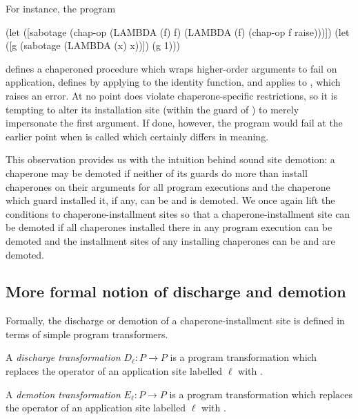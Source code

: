 For instance, the program
\begin{schemedisplay}
(let ([sabotage (chap-op (LAMBDA (f) f) (LAMBDA (f) (chap-op f raise)))])
  (let ([g (sabotage (LAMBDA (x) x))])
    (g 1)))
\end{schemedisplay}
defines a chaperoned procedure  which wraps higher-order arguments to fail on application, defines  by applying  to the identity function, and applies  to , which raises an error.
At no point does  violate chaperone-specific restrictions, so it is tempting to alter its installation site (within the guard of ) to merely impersonate the first argument.
If done, however, the program would fail at the earlier point when  is called which certainly differs in meaning.

This observation provides us with the intuition behind sound site demotion: a chaperone may be demoted if neither of its guards do more than install chaperones on their arguments for all program executions and the chaperone which guard installed it, if any, can be and is demoted. 
We once again lift the conditions to chaperone-installment sites so that a chaperone-installment site can be demoted if all chaperones installed there in any program execution can be demoted and the installment sites of any installing chaperones can be and are demoted.



\subsection{More formal notion of discharge and demotion}

Formally, the discharge or demotion of a chaperone-installment site is defined in terms of simple program transformers.

\begin{definition}
A \emph{discharge transformation} $D_\ell : P\rightarrow P$ is a program transformation which replaces the operator of an application site labelled $\ell$ with .
\end{definition}

\begin{definition}
A \emph{demotion transformation} $E_\ell : P\rightarrow P$ is a program transformation which replaces the operator of an application site labelled $\ell$ with .
\end{definition}

